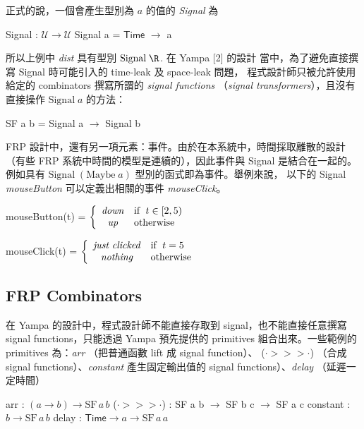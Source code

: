 \documentclass{article}
\newcommand{\Time}{\mathsf{Time}}
\newcommand{\U}{\mathcal{U}}
\begin{document}
  正式的說，一個會產生型別為 $a$ 的值的 \emph{Signal} 為

  \begin{code}
  Signal : $\U\to\U$
  Signal a = $\Time$ $\to$ a
  \end{code}

  所以上例中 \textit{dist} 具有型別 $\text{Signal}\; \R$. 在 Yampa [2] 的設計
  當中，為了避免直接撰寫 Signal 時可能引入的 time-leak 及 space-leak 問題，
  程式設計師只被允許使用給定的 combinators 撰寫所謂的 \emph{signal functions}
  （\emph{signal transformers}），且沒有直接操作 $\text{Signal}\; a$ 的方法：

  \begin{code}
  SF a b = Signal a $\to$ Signal b
  \end{code}

  FRP 設計中，還有另一項元素：事件。由於在本系統中，時間採取離散的設計
  （有些 FRP 系統中時間的模型是連續的），因此事件與 Signal 是結合在一起的。
  例如具有 $\text{Signal}\;(\text{Maybe}\;a)$ 型別的函式即為事件。舉例來說，
  以下的 Signal \textit{mouseButton} 可以定義出相關的事件
  \textit{mouseClick}。

  \begin{code}
  mouseButton(t) = $\displaystyle \left\{ \begin{array}{cl} \mathit{down} & \text{if\; } t\in [2,5) \\ \mathit{up} & \text{otherwise} \end{array} \right.$

  mouseClick(t) = $\displaystyle \left\{ \begin{array}{cl} \mathit{just\; clicked} & \text{if\; } t=5 \\ \mathit{nothing} & \text{otherwise} \end{array} \right.$
  \end{code}


  \subsection{FRP Combinators}

  在 Yampa 的設計中，程式設計師不能直接存取到 signal，也不能直接任意撰寫
  signal functions，只能透過 Yampa 預先提供的 primitives 組合出來。一些範例的
  primitives 為：\textit{arr} （把普通函數 lift 成 signal function）、
  ($\cdot>\!\!>\!\!>\cdot$) （合成 signal functions）、\textit{constant}
  產生固定輸出值的 signal functions）、\textit{delay} （延遲一定時間）

  \begin{code}
  arr : $(a\to b)\to \text{SF}\,a\,b$
  ($\cdot>\!\!>\!\!>\cdot$) : SF a b $\to$ SF b c $\to$ SF a c
  constant : $b\to\text{SF}\,a\,b$
  delay : $\Time\to a\to\text{SF}\,a\,a$
  \end{code}
\end{document}
